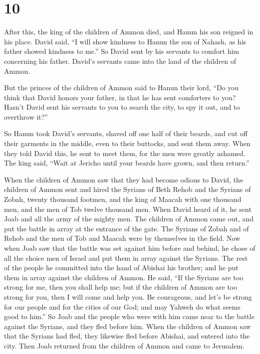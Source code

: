 \hypertarget{section-9}{%
\section{10}\label{section-9}}

 After this, the king of the children of Ammon died, and
Hanun his son reigned in his place.  David said, ``I will
show kindness to Hanun the son of Nahash, as his father showed kindness
to me.'' So David sent by his servants to comfort him concerning his
father. David's servants came into the land of the children of Ammon.

 But the princes of the children of Ammon said to Hanun
their lord, ``Do you think that David honors your father, in that he has
sent comforters to you? Hasn't David sent his servants to you to search
the city, to spy it out, and to overthrow it?''

 So Hanun took David's servants, shaved off one half of
their beards, and cut off their garments in the middle, even to their
buttocks, and sent them away.  When they told David this, he
sent to meet them, for the men were greatly ashamed. The king said,
``Wait at Jericho until your beards have grown, and then return.''

 When the children of Ammon saw that they had become odious
to David, the children of Ammon sent and hired the Syrians of Beth Rehob
and the Syrians of Zobah, twenty thousand footmen, and the king of
Maacah with one thousand men, and the men of Tob twelve thousand men.
 When David heard of it, he sent Joab and all the army of
the mighty men.  The children of Ammon came out, and put the
battle in array at the entrance of the gate. The Syrians of Zobah and of
Rehob and the men of Tob and Maacah were by themselves in the field.
 Now when Joab saw that the battle was set against him
before and behind, he chose of all the choice men of Israel and put them
in array against the Syrians.  The rest of the people he
committed into the hand of Abishai his brother; and he put them in array
against the children of Ammon.  He said, ``If the Syrians
are too strong for me, then you shall help me; but if the children of
Ammon are too strong for you, then I will come and help you.
 Be courageous, and let's be strong for our people and for
the cities of our God; and may Yahweh do what seems good to him.''
 So Joab and the people who were with him came near to the
battle against the Syrians, and they fled before him.  When
the children of Ammon saw that the Syrians had fled, they likewise fled
before Abishai, and entered into the city. Then Joab returned from the
children of Ammon and came to Jerusalem.

